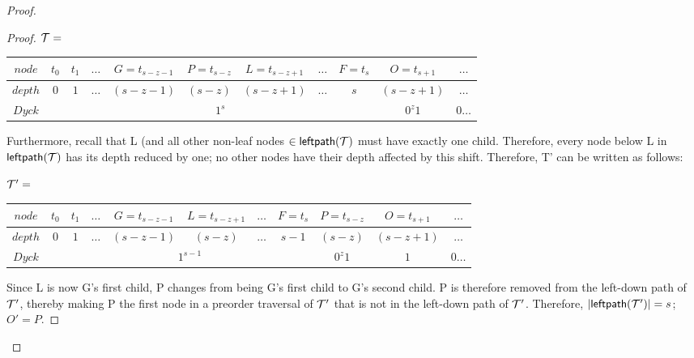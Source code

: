 \begin{proof}
\begin{proof}
    \bigskip
    \bigskip

	    $\mathcal{T}=$
    \begin{center}
	\begin{tabular}{ |c|c|c|c|c|c|c|c|c|c|c| } 
	    \hline

	    $node$ & $t_0$ & $t_1$ & $\dots$ & $G=t_{s-z-1}$ & $P=t_{s-z}$ & $L=t_{s-z+1}$ & $\dots$ & $F=t_s$ & $O=t_{s+1}$ & $\dots$ \\
	    \hline
	    $depth$ & $0$ & $1$ & $\dots$ & $(s-z-1)$ & $(s-z)$ & $(s-z+1)$ & $\dots$ & $s$  & $(s-z+1)$ & $\dots$\\
	    \hline
	    $Dyck$ &  &  \multicolumn{7}{|c|}{$1^s$} &  $0^{z}1$   & $0\dots$\\
	    \hline
	\end{tabular}
    \end{center}

    Furthermore, recall that L (and all other non-leaf nodes $\in \mathsf{leftpath}{(\mathcal{T})}$ must have exactly one child.  Therefore, every node below L in $\mathsf{leftpath}{(\mathcal{T})}$ has its depth reduced by one; no other nodes have their depth affected by this shift. Therefore, T' can be written as follows:

    \bigskip


	    $\mathcal{T}'=$
    \begin{center}
	\begin{tabular}{ |c|c|c|c|c|c|c|c|c|c|c| } 
	    \hline

	    $node$ & $t_0$ & $t_1$ & $\dots$ & $G=t_{s-z-1}$ & $L=t_{s-z+1}$ & $\dots$ & $F=t_s$ & $P=t_{s-z}$ & $O=t_{s+1}$ & $\dots$ \\
	    \hline
	    $depth$ & $0$ & $1$ & $\dots$ & $(s-z-1)$ & $(s-z)$ & $\dots$ & $s-1$ & $(s-z)$  & $(s-z+1)$ & $\dots$\\
	    \hline
	    $Dyck$ &  &  \multicolumn{6}{|c|}{$1^{s-1}$} &  $0^{z}1$   & $1$ & $0\dots$\\
	    \hline
	\end{tabular}
    \end{center}

    Since L is now G's first child, P changes from being G's first child to G's second child.  P is therefore removed from the left-down path of $\mathcal{T}'$, thereby making P the first node in a preorder traversal of $\mathcal{T}'$ that is not in the left-down path of $\mathcal{T}'$.  
    Therefore, $|\mathsf{leftpath}{(\mathcal{T'})}|=s$; $O'=P$. %



\end{proof}
\end{proof}
